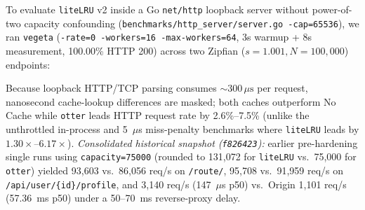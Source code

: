 \documentclass[11pt,a4paper]{article}
\begin{document}
To evaluate \texttt{liteLRU} v2 inside a Go \texttt{net/http} loopback server without power-of-two capacity confounding (\texttt{benchmarks/http\_server/server.go -cap=65536}), we ran \texttt{vegeta} (\texttt{-rate=0 -workers=16 -max-workers=64}, 3s warmup + 8s measurement, 100.00\% HTTP 200) across two Zipfian ($s=1.001, N=100{,}000$) endpoints:

\begin{table}[h]
\centering
{}
\caption{Matched-capacity (\texttt{cap=65,536}) \texttt{vegeta} loopback HTTP benchmarks on \texttt{liteLRU} v2 vs.\ \texttt{otter v1.2.4}.}
\end{table}

Because loopback HTTP/TCP parsing consumes $\sim 300\,\mu\text{s}$ per request, nanosecond cache-lookup differences are masked; both caches outperform No Cache while \texttt{otter} leads HTTP request rate by 2.6\%--7.5\% (unlike the unthrottled in-process and 5~$\mu$s miss-penalty benchmarks where \texttt{liteLRU} leads by $1.30\times$--$6.17\times$). \textit{Consolidated historical snapshot (\texttt{f826423}):} earlier pre-hardening single runs using \texttt{capacity=75000} (rounded to 131,072 for \texttt{liteLRU} vs.\ 75,000 for \texttt{otter}) yielded 93,603 vs.\ 86,056 req/s on \texttt{/route/}, 95,708 vs.\ 91,959 req/s on \texttt{/api/user/\{id\}/profile}, and 3,140 req/s (147~$\mu$s p50) vs.\ Origin 1,101 req/s (57.36~ms p50) under a 50--70~ms reverse-proxy delay.
\end{document}
